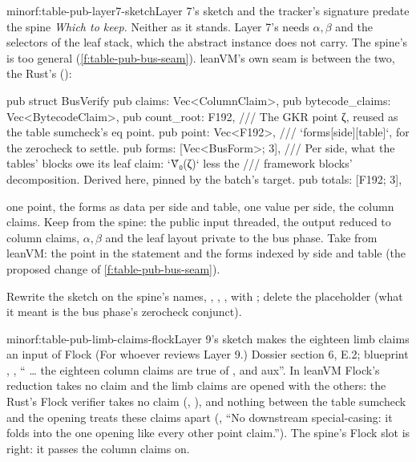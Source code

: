 \begin{finding}{minor}{f:table-pub-layer7-sketch}{Layer 7's sketch and the tracker's signature predate the spine}
\emph{Which to keep.} Neither as it stands. Layer 7's needs $α, β$ and the selectors of the leaf
stack, which the abstract instance does not carry. The spine's is too general
(\cref{f:table-pub-bus-seam}). leanVM's own seam is between the two, the Rust's 
():
\begin{srccode}
pub struct BusVerify {
    pub claims: Vec<ColumnClaim>,
    pub bytecode_claims: Vec<BytecodeClaim>,
    pub count_root: F192,
    /// The GKR point ζ, reused as the table sumcheck's eq point.
    pub point: Vec<F192>,
    /// `forms[side][table]`, for the zerocheck to settle.
    pub forms: [Vec<BusForm>; 3],
    /// Per side, what the tables' blocks owe its leaf claim: `Ṽ₀(ζ)` less the
    /// framework blocks' decomposition. Derived here, pinned by the batch's target.
    pub totals: [F192; 3],
}
\end{srccode}
one point, the forms as data per side and table, one value per side, the column claims. Keep from
the spine: the public input threaded, the output reduced to column claims, $α, β$ and the leaf
layout private to the bus phase. Take from leanVM: the point in the statement and the forms
indexed by side and table (the proposed change of \cref{f:table-pub-bus-seam}).

 Rewrite the sketch on the spine's names,
,
, , with
; delete the placeholder (what it meant is the bus
phase's zerocheck conjunct).
\end{finding}

\begin{finding}{minor}{f:table-pub-limb-claims-flock}{Layer 9's sketch makes the eighteen limb claims an input of Flock}
 (For whoever reviews Layer 9.) Dossier section 6, E.2; blueprint
, ,
`` … the eighteen column claims are true of , and aux''. In leanVM
Flock's reduction takes no claim and the limb claims are opened with the others: the Rust's Flock
verifier takes no claim (, ), and
nothing between the table sumcheck and the opening treats these claims apart
(, ``No downstream special-casing: it folds into the one opening like
every other point claim.''). The spine's Flock slot is right: it passes the column claims on.
\end{finding}

